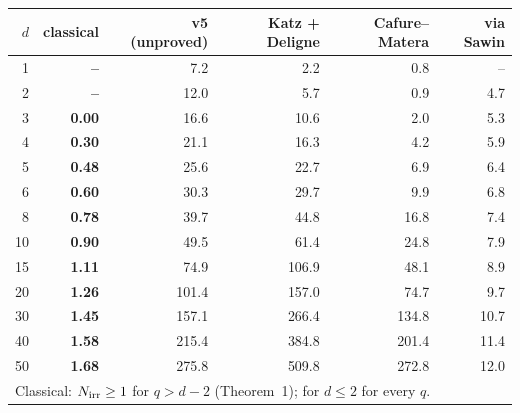 \begin{tabular}{rrrrrr}
\toprule
$d$ & classical & v5 (unproved) & Katz + Deligne & Cafure--Matera & via Sawin \\
\midrule
1 & \textbf{--} & 7.2 & 2.2 & 0.8 & -- \\
2 & \textbf{--} & 12.0 & 5.7 & 0.9 & 4.7 \\
3 & \textbf{0.00} & 16.6 & 10.6 & 2.0 & 5.3 \\
4 & \textbf{0.30} & 21.1 & 16.3 & 4.2 & 5.9 \\
5 & \textbf{0.48} & 25.6 & 22.7 & 6.9 & 6.4 \\
6 & \textbf{0.60} & 30.3 & 29.7 & 9.9 & 6.8 \\
8 & \textbf{0.78} & 39.7 & 44.8 & 16.8 & 7.4 \\
10 & \textbf{0.90} & 49.5 & 61.4 & 24.8 & 7.9 \\
15 & \textbf{1.11} & 74.9 & 106.9 & 48.1 & 8.9 \\
20 & \textbf{1.26} & 101.4 & 157.0 & 74.7 & 9.7 \\
30 & \textbf{1.45} & 157.1 & 266.4 & 134.8 & 10.7 \\
40 & \textbf{1.58} & 215.4 & 384.8 & 201.4 & 11.4 \\
50 & \textbf{1.68} & 275.8 & 509.8 & 272.8 & 12.0 \\
\bottomrule
\multicolumn{6}{l}{\footnotesize Classical: $N_{\rm irr}\ge1$ for $q>d-2$ (Theorem~1); for $d\le2$ for every $q$.}
\end{tabular}